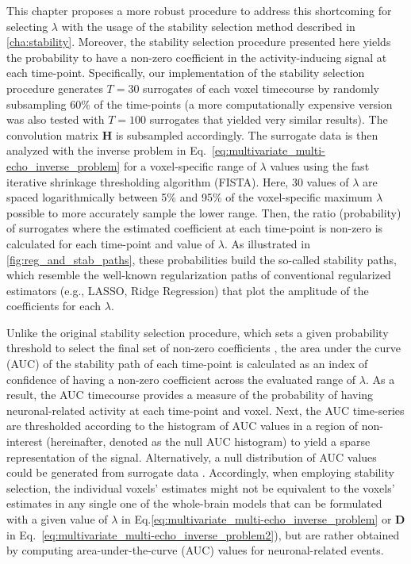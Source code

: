 This chapter proposes a more robust procedure to address this shortcoming 
for selecting $\lambda$ with the usage of the stability selection method
\citep{Meinshausen2010Stabilityselection} described in \cref{cha:stability}. 
Moreover, the stability selection procedure presented here yields the probability 
to have a non-zero coefficient in the activity-inducing signal at each time-point. 
Specifically, our implementation of the stability selection procedure generates $T=30$ 
surrogates of each voxel timecourse by randomly subsampling 60\% of the time-points (a 
more computationally expensive version was also tested with $T=100$ surrogates that
yielded very similar results). The convolution matrix $\mathbf{H}$ is subsampled
accordingly. The surrogate data is then analyzed with the inverse problem in
Eq.~\eqref{eq:multivariate_multi-echo_inverse_problem} for a voxel-specific
range of $\lambda$ values using the fast iterative shrinkage thresholding
algorithm (FISTA). Here, 30 values of $\lambda$ are spaced logarithmically
between 5\% and 95\% of the voxel-specific maximum $\lambda$ possible to more
accurately sample the lower range. Then, the ratio (probability) of surrogates
where the estimated coefficient at each time-point is non-zero is calculated for
each time-point and value of $\lambda$.  As illustrated in
\cref{fig:reg_and_stab_paths}, these probabilities build the so-called stability
paths, which resemble the well-known regularization paths of conventional
regularized estimators (e.g., LASSO, Ridge Regression) that plot the amplitude
of the coefficients for each $\lambda$. 

Unlike the original stability selection procedure, which sets a given
probability threshold to select the final set of non-zero coefficients
\citep{Meinshausen2010Stabilityselection}, the area under the curve (AUC) of the
stability path of each time-point is calculated as an index of confidence of
having a non-zero coefficient across the evaluated range of $\lambda$. As a
result, the AUC timecourse provides a measure of the probability of
having neuronal-related activity at each time-point and voxel. Next, the AUC
time-series are thresholded according to the histogram of AUC values in a region
of non-interest (hereinafter, denoted as the null AUC histogram) to yield a
sparse representation of the signal. Alternatively, a null distribution of AUC
values could be generated from surrogate data
\citep{Liegeois2021Interpretingnullmodels}. Accordingly, when employing
stability selection, the individual voxels' estimates might not be equivalent to
the voxels' estimates in any single one of the whole-brain models that can be
formulated with a given value of $\lambda$ in
Eq.\eqref{eq:multivariate_multi-echo_inverse_problem} or $\mathbf{D}$ in
Eq.~\eqref{eq:multivariate_multi-echo_inverse_problem2}), but are rather
obtained by computing area-under-the-curve (AUC) values for neuronal-related
events.

